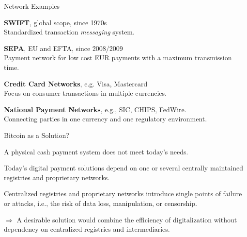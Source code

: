 \documentclass[handout]{beamer}
\begin{document}
\begin{frame}{Network Examples}

\textbf{SWIFT}, global scope, since 1970s\\
Standardized transaction \textit{messaging }system.

\vspace{1em}

\textbf{SEPA}, EU and EFTA, since 2008/2009\\
Payment network for low cost EUR payments with a maximum transmission time.

\vspace{1em}

\textbf{Credit Card Networks}, e.g. Visa, Mastercard\\
Focus on consumer transactions in multiple currencies. 

\vspace{1em}

\textbf{National Payment Networks}, e.g., SIC, CHIPS, FedWire.\\ 
Connecting parties in one currency and one regulatory environment.

\end{frame}

\begin{frame}{Bitcoin as a Solution?}

A physical cash payment system does not meet today's needs.
\vspace{1em}

Today's digital payment solutions depend on one or several centrally maintained registries and proprietary networks.
\vspace{1em}

Centralized registries and proprietary networks introduce single points of failure or attacks, i.e., the risk of data loss, manipulation, or censorship.
\vspace{1em}


$\Rightarrow$ A desirable solution would \color{focus} combine the efficiency of digitalization without dependency on centralized registries \color{black} and intermediaries. 
	
\end{frame}
\end{document}
